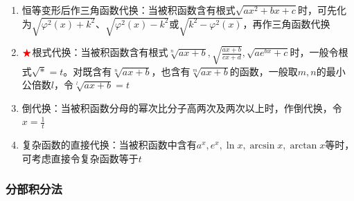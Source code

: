 \documentclass[a4paper,12pt]{article}
\begin{document}
\begin{enumerate}
\begin{itemize}
\begin{center}
\begin{tikzpicture}[scale=0.8]
                \end{tikzpicture}
            \end{center}
            \item $\sqrt {x^2 - a^2} \Rightarrow$ 令$x = a\sec t$
            \[
                \begin{cases}
                    x > 0 \;\Longrightarrow\; 0 < t < \dfrac{\pi}{2}, \\[6pt]
                    x < 0 \;\Longrightarrow\; \dfrac{\pi}{2} < t < \pi.
                \end{cases}
            \]
        \end{itemize}
        \item 恒等变形后作三角函数代换：当被积函数含有根式$\sqrt {ax^2 + bx + c}$时，可先化为$\sqrt {\varphi^2(x) + k^2}$、$\sqrt {\varphi^2(x) - k^2}$或$\sqrt {k^2 - \varphi^2(x)}$，再作三角函数代换
        \item ${\color{red}{\bigstar}}$根式代换：当被积函数含有根式$\sqrt[n]{ax + b}, \sqrt {\displaystyle\frac{ax + b}{cx + d}}, \sqrt {ae^{bx} + c}$时，一般令根式$\sqrt {*} = t$。对既含有$\sqrt[n]{ax + b}$，也含有$\sqrt[m]{ax + b}$的函数，一般取$m, n$的最小公倍数$l$，令$\sqrt[l]{ax + b} = t$
        \item 倒代换：当被积函数分母的幂次比分子高两次及两次以上时，作倒代换，令$x = \displaystyle\frac{1}{t}$
        \item 复杂函数的直接代换：当被积函数中含有$a^x, e^x, \ln x, \arcsin x, \arctan x$等时，可考虑直接令复杂函数等于$t$
    \end{enumerate}

    \subsubsection{分部积分法}
\end{document}
